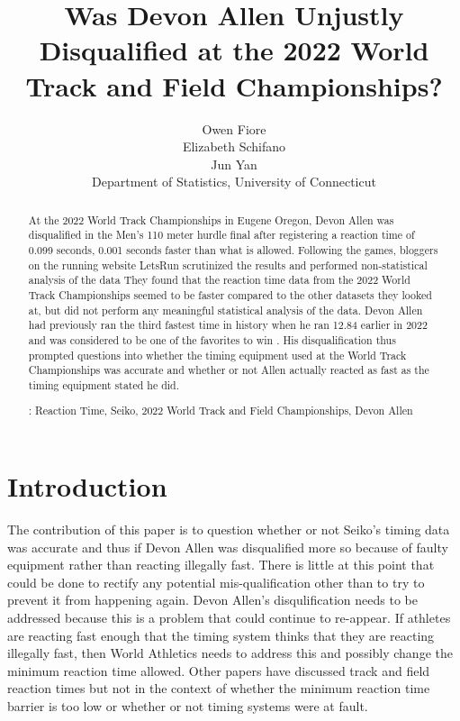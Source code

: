 \documentclass[12pt, letterpaper, titlepage]{article}
\title{Was Devon Allen Unjustly Disqualified at the 2022 World Track and Field Championships?}
\author{Owen Fiore\\
  Elizabeth Schifano\\
  Jun Yan\\[1ex]
  Department of Statistics, University of Connecticut\\
}
\date{}
\begin{document}
\maketitle

\doublespace

\begin{abstract}
  At the 2022 World Track Championships in Eugene Oregon, Devon Allen was disqualified in the
  Men's 110 meter hurdle final after registering a reaction time of 0.099 seconds, 0.001 
  seconds faster than what is allowed.  Following the games, bloggers on the running website 
  LetsRun scrutinized the results and performed non-statistical analysis of the data \citep{Johnson}
  They found that the reaction time data from the 2022 World Track Championships seemed to be faster 
  compared to the other datasets they looked at, but did not perform any meaningful statistical 
  analysis of the data.  Devon Allen had previously ran the third fastest time in history when 
  he ran 12.84 earlier in 2022 and was considered to be one of the favorites to win \citep{Preview}.  His 
  disqualification thus prompted questions into whether the timing equipment used at the World
  Track Championships was accurate and whether or not Allen actually reacted as fast as the 
  timing equipment stated he did.

\bigskip
\noindent{}:
Reaction Time, Seiko, 2022 World Track and Field Championships, Devon Allen

\end{abstract}



\section{Introduction}
\label{sec:intro}


The contribution of this paper is to question whether or not Seiko's timing data
was accurate and thus if Devon Allen was disqualified more so because of faulty
equipment rather than reacting illegally fast.  There is little at this point
that could be done to rectify any potential mis-qualification other than to try
to prevent it from happening again. Devon Allen's disqulification needs to be
addressed because this is a problem that could continue to re-appear.  If athletes
are reacting fast enough that the timing system thinks that they are reacting
illegally fast, then World Athletics needs to address this and possibly change
the minimum reaction time allowed.  Other papers have discussed track and field
reaction times but not in the context of whether the minimum reaction time barrier
is too low or whether or not timing systems were at fault.
\end{document}
